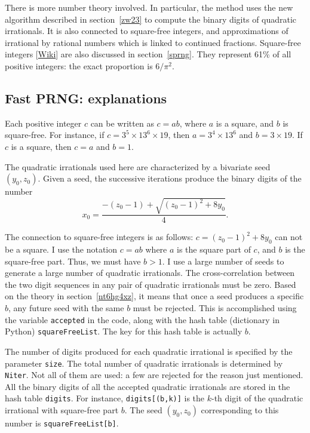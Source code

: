 \documentclass[oneside,10pt]{book}
\begin{document}
There is more number theory involved. In particular, the method uses the new algorithm 
 described in section~\ref{zw23} to compute the binary digits of quadratic irrationals. It is also connected
 to \textcolor{index}{square-free integers}, and approximations of irrational by rational numbers which is linked to continued fractions.
 Square-free integers [\href{https://en.wikipedia.org/wiki/Square-free_integer}{Wiki}] are also discussed in section~\ref{sprng}. They represent 
61\% of all positive integers: the exact proportion is $6/\pi^2$. 

\subsection{Fast PRNG: explanations}\label{5fdi75fg}

Each positive integer  $c$ can be written as $c=ab$, where $a$ is a square, and $b$ is square-free. For instance, if $c=3^5 \times 13^6 \times 19$, then $a=3^4\times 13^6$ and $b=3\times 19$. If $c$ is a square, then $c=a$ and $b=1$. 

The quadratic irrationals used here are characterized by a bivariate \textcolor{index}{seed} $(y_0, z_0)$. Given a seed, the successive iterations produce the binary digits of the number  
 \begin{equation}
x_0 = \frac{-(z_0-1) + \sqrt{(z_0-1)^2+8y_0}}{4}.\label{butaneneon}
\end{equation}

The connection to square-free integers is as follows: $c=(z_0-1)^2 +8y_0$ can not be a square. I use the notation
 $c=ab$ where $a$ is the square part of $c$, and $b$ is the square-free part. Thus, we must have $b>1$. I use a large number of seeds to generate a large number of quadratic irrationals. The cross-correlation between the two digit sequences in any pair of quadratic irrationals must be zero. Based on the theory in section~\ref{nt6hg4xz}, it means that once a seed produces a specific $b$, any future seed with the same $b$ must be rejected. This is accomplished using the variable \texttt{accepted} in the code, along with
 the \textcolor{index}{hash table} (dictionary in Python) \texttt{squareFreeList}. The key for this hash table is actually $b$.

The number of digits produced for each quadratic irrational is specified by the parameter \texttt{size}. The total number of quadratic irrationals is determined by \texttt{Niter}. Not all of them are used: a few are rejected for the reason just mentioned. All the binary digits of all the accepted quadratic irrationals are stored in the hash table \texttt{digits}. For instance,
 \texttt{digits[(b,k)]} is the $k$-th digit of the quadratic irrational with square-free part $b$. The
 seed $(y_0,z_0)$ corresponding to this number is \texttt{squareFreeList[b]}.
\end{document}
